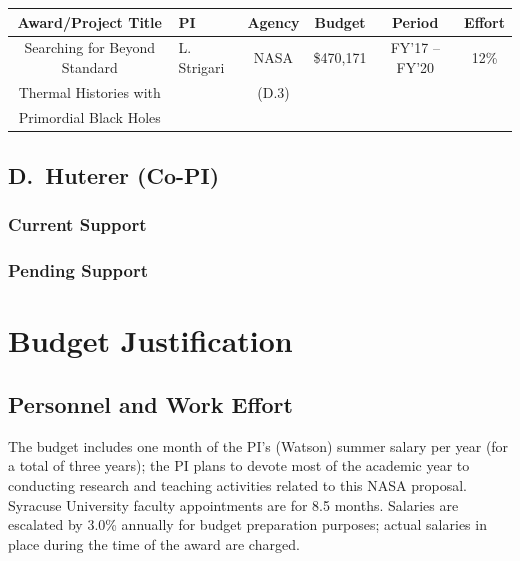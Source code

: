 \documentclass[useAMS,12pt]{article}
\begin{document}
\begin{center}
\begin{tabular}{|c|l|c|c|c|c|}
\hline\hline
\bf Award/Project Title & \bf PI & \bf Agency & \bf Budget &  \bf Period & \bf Effort\\
\hline
Searching for Beyond Standard    & L. Strigari  & NASA & \$470,171 & FY{'}17 -- FY{'}20 & 12\% \\
Thermal   Histories with  &   &  (D.3)   &&& \\
Primordial Black Holes   &   &     &&& \\
\hline
\end{tabular}
\end{center}


\subsection{D.\ Huterer (Co-PI)}

\subsubsection{Current Support}

\subsubsection{Pending Support}




\section{Budget Justification}

\subsection{Personnel and Work Effort}
The budget includes one month of the PI's (Watson) summer salary per year (for a total of three
years); the PI plans to devote most of the academic year to conducting research and
teaching activities related to this NASA proposal.
Syracuse University faculty appointments are for 8.5 months.  Salaries are escalated by 3.0\%
annually for budget preparation purposes; actual salaries in place during the time of the award are charged.
\end{document}
